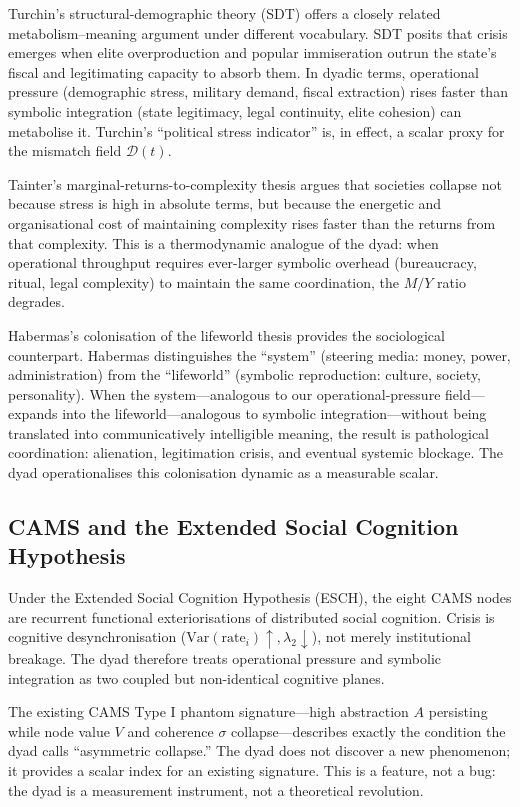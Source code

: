 \documentclass[11pt,a4paper]{article}
\begin{document}
Turchin's structural-demographic theory (SDT) offers a closely related metabolism--meaning argument under different vocabulary. SDT posits that crisis emerges when elite overproduction and popular immiseration outrun the state's fiscal and legitimating capacity to absorb them. In dyadic terms, operational pressure (demographic stress, military demand, fiscal extraction) rises faster than symbolic integration (state legitimacy, legal continuity, elite cohesion) can metabolise it. Turchin's ``political stress indicator'' is, in effect, a scalar proxy for the mismatch field \(\mathcal{D}(t)\).

Tainter's marginal-returns-to-complexity thesis argues that societies collapse not because stress is high in absolute terms, but because the energetic and organisational cost of maintaining complexity rises faster than the returns from that complexity. This is a thermodynamic analogue of the dyad: when operational throughput requires ever-larger symbolic overhead (bureaucracy, ritual, legal complexity) to maintain the same coordination, the \(M/Y\) ratio degrades.

Habermas's colonisation of the lifeworld thesis provides the sociological counterpart. Habermas distinguishes the ``system'' (steering media: money, power, administration) from the ``lifeworld'' (symbolic reproduction: culture, society, personality). When the system---analogous to our operational-pressure field---expands into the lifeworld---analogous to symbolic integration---without being translated into communicatively intelligible meaning, the result is pathological coordination: alienation, legitimation crisis, and eventual systemic blockage. The dyad operationalises this colonisation dynamic as a measurable scalar.

\subsection{CAMS and the Extended Social Cognition Hypothesis}
Under the Extended Social Cognition Hypothesis (ESCH), the eight CAMS nodes are recurrent functional exteriorisations of distributed social cognition. Crisis is cognitive desynchronisation (\(\text{Var}(\text{rate}_i)\uparrow,\lambda_2\downarrow\)), not merely institutional breakage. The dyad therefore treats operational pressure and symbolic integration as two coupled but non-identical cognitive planes.

The existing CAMS Type I phantom signature---high abstraction \(A\) persisting while node value \(V\) and coherence \(\sigma\) collapse---describes exactly the condition the dyad calls ``asymmetric collapse.'' The dyad does not discover a new phenomenon; it provides a scalar index for an existing signature. This is a feature, not a bug: the dyad is a measurement instrument, not a theoretical revolution.
\end{document}
